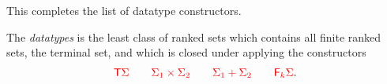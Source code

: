 %
%






\smallskip
\newcommand{\funcitem}[3]{\ranked{#1  } &:& \ranked{#2} \rto  \ranked{#3}}

 This completes the list of  datatype constructors.  
 \begin{definition}[Datatypes]
    \label{def:types}  
        The \emph{datatypes} is the least class of ranked sets which contains all finite ranked sets, the terminal set, and which is closed under applying the constructors 
        \begin{align*}
        {\color{red}{{\color{red}{\mathsf T}}{\color{red}{\Sigma}}\qquad {\color{red}{\Sigma}}_1 \times{\color{red}{\Sigma}}_2 \qquad {\color{red}{\Sigma}}_1 + {\color{red}{\Sigma}}_2 \qquad {\color{red}{\mathsf F_{k}}}{\color{red}{\Sigma}}}}.
        \end{align*}
            \end{definition}


 \newcommand{\combfunc}[4]
 {
     \ranked{#1} : & \ranked{#2  \to #3} & \text{ for }\ranked{#4}
 }

